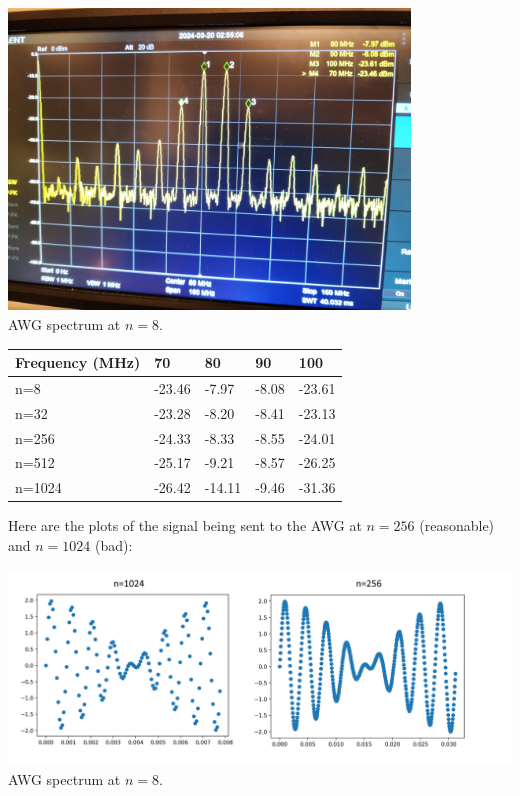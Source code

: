\documentclass{article}
\begin{document}
    \begin{mdframed}[backgroundcolor=gray!20, align = center, userdefinedwidth = 4.5in]
    \includegraphics[width = 4.2in]{img/awg_spectrum.jpg}\\
    AWG spectrum at $n=8$.
    \end{mdframed}
    \begin{table}[H]
    \centering
    \begin{tabular}{|l|l|l|l|l|}
    \hline
    Frequency (MHz) & 70 & 80 & 90 & 100 \\ \hline
    n=8 & -23.46 & -7.97 & -8.08 & -23.61 \\ \hline
    n=32 & -23.28 & -8.20 & -8.41 & -23.13 \\ \hline
    n=256 & -24.33 & -8.33 & -8.55 & -24.01 \\ \hline
    n=512 & -25.17 & -9.21 & -8.57 & -26.25 \\ \hline
    n=1024 & -26.42 & -14.11 & -9.46 & -31.36 \\ \hline
    \end{tabular}
    \end{table}
    Here are the plots of the signal being sent to the AWG at $n=256$ (reasonable) and $n=1024$ (bad):
    \begin{mdframed}[backgroundcolor=gray!20, align = center, userdefinedwidth = 5.9in]
    \includegraphics[width = 5.6in]{img/plt_plot_waves.png}\\
    AWG spectrum at $n=8$.
    \end{mdframed}
\end{document}

